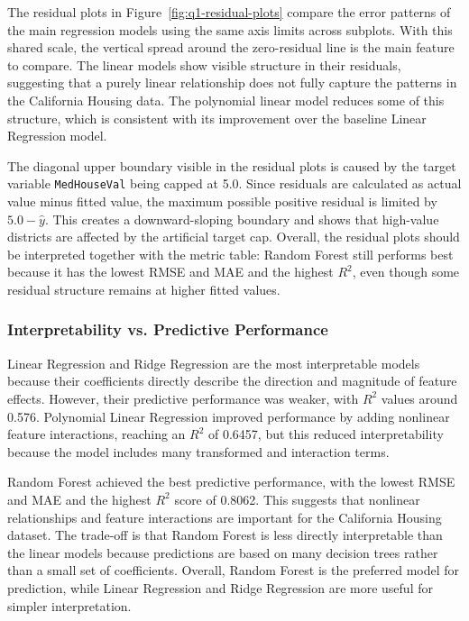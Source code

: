 \documentclass[11pt]{article}
\begin{document}
The residual plots in Figure~\ref{fig:q1-residual-plots} compare the error patterns of the main regression models using the same axis limits across subplots. With this shared scale, the vertical spread around the zero-residual line is the main feature to compare. The linear models show visible structure in their residuals, suggesting that a purely linear relationship does not fully capture the patterns in the California Housing data. The polynomial linear model reduces some of this structure, which is consistent with its improvement over the baseline Linear Regression model.

The diagonal upper boundary visible in the residual plots is caused by the target variable \texttt{MedHouseVal} being capped at 5.0. Since residuals are calculated as actual value minus fitted value, the maximum possible positive residual is limited by $5.0 - \hat{y}$. This creates a downward-sloping boundary and shows that high-value districts are affected by the artificial target cap. Overall, the residual plots should be interpreted together with the metric table: Random Forest still performs best because it has the lowest RMSE and MAE and the highest $R^2$, even though some residual structure remains at higher fitted values.

\subsubsection{Interpretability vs. Predictive Performance}

Linear Regression and Ridge Regression are the most interpretable models because their coefficients directly describe the direction and magnitude of feature effects. However, their predictive performance was weaker, with $R^2$ values around 0.576. Polynomial Linear Regression improved performance by adding nonlinear feature interactions, reaching an $R^2$ of 0.6457, but this reduced interpretability because the model includes many transformed and interaction terms.

Random Forest achieved the best predictive performance, with the lowest RMSE and MAE and the highest $R^2$ score of 0.8062. This suggests that nonlinear relationships and feature interactions are important for the California Housing dataset. The trade-off is that Random Forest is less directly interpretable than the linear models because predictions are based on many decision trees rather than a small set of coefficients. Overall, Random Forest is the preferred model for prediction, while Linear Regression and Ridge Regression are more useful for simpler interpretation.
\end{document}
